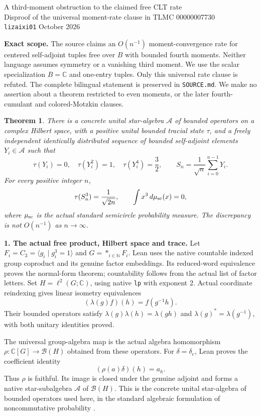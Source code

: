 \documentclass[10pt]{article}
\newtheorem{theorem}{Theorem}
\newcommand{\C}{\mathbb C}
\newcommand{\N}{\mathbb N}
\newcommand{\A}{\mathcal A}
\begin{document}
\begin{center}
{\Large A third-moment obstruction to the claimed free CLT rate}\\[4pt]
{\large Disproof of the universal moment-rate clause in TLMC 00000007730}\\[3pt]
\texttt{lizaixi01} October 2026
\end{center}

\textbf{Exact scope.}
The source claims an $O(n^{-1})$ moment-convergence rate for centered
self-adjoint tuples free over $B$ with bounded fourth moments. Neither
language assumes symmetry or a vanishing third moment. We use the
scalar specialization $B=\C$ and one-entry tuples. Only this universal
rate clause is refuted. The complete bilingual statement is preserved
in \texttt{SOURCE.md}. We make no assertion about a theorem restricted
to even moments, or the later fourth-cumulant and colored-Motzkin clauses.

\begin{theorem}
There is a concrete unital star-algebra $\A$ of bounded operators on a
complex Hilbert space, with a positive unital bounded tracial state $\tau$,
and a freely independent identically distributed sequence of bounded
self-adjoint elements $Y_i\in\A$ such that
\[
 \tau(Y_i)=0,\quad \tau(Y_i^2)=1,\quad \tau(Y_i^4)=\frac32,
 \qquad
 S_n=\frac1{\sqrt n}\sum_{i=0}^{n-1}Y_i.
\]
For every positive integer $n$,
\[
 \tau(S_n^3)=\frac1{\sqrt{2n}},\qquad
 \int x^3\,d\mu_{\rm sc}(x)=0,
\]
where $\mu_{\rm sc}$ is the actual standard semicircle probability measure.
The discrepancy is not $O(n^{-1})$ as $n\to\infty$.
\end{theorem}

\textbf{1. The actual free product, Hilbert space and trace.}
Let $F_i=C_3=\langle g_i\mid g_i^3=1\rangle$ and
$G=*_{i\in\N}F_i$. Lean uses the native countable indexed group coproduct
and its genuine factor embeddings. Its reduced-word equivalence proves
the normal-form theorem; countability follows from the actual list of
factor letters. Set $H=\ell^2(G;\C)$, using native \texttt{lp} with exponent
$2$. Actual coordinate reindexing gives linear isometry equivalences
\[
 (\lambda(g)f)(h)=f(g^{-1}h).
\]
Their bounded operators satisfy $\lambda(g)\lambda(h)=\lambda(gh)$
and $\lambda(g)^*=\lambda(g^{-1})$, with both unitary identities proved.

The universal group-algebra map is the actual algebra homomorphism
$\rho:\C[G]\to\mathcal B(H)$ obtained from these operators. For
$\delta=\delta_e$, Lean proves the coefficient identity
\[
 (\rho(a)\delta)(h)=a_h.
\]
Thus $\rho$ is faithful. Its image is closed under the genuine adjoint
and forms a native star-subalgebra $\A$ of $\mathcal B(H)$.
This is the concrete unital star-algebra of bounded operators used here,
in the standard algebraic formulation of noncommutative probability
\cite[p.~332]{Novak}.
\end{document}
